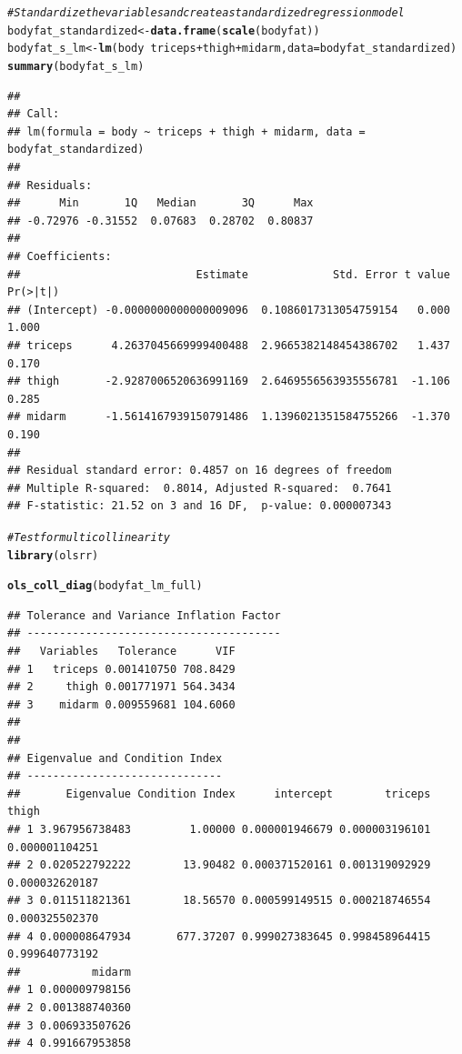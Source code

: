 \documentclass{article}\usepackage[]{graphicx}\usepackage[]{color}
\makeatletter
\newcommand{\hlcom}[1]{\textcolor[rgb]{0.678,0.584,0.686}{\textit{#1}}}%
\newcommand{\hlopt}[1]{\textcolor[rgb]{0,0,0}{#1}}%
\newcommand{\hlstd}[1]{\textcolor[rgb]{0.345,0.345,0.345}{#1}}%
\newcommand{\hlkwb}[1]{\textcolor[rgb]{0.69,0.353,0.396}{#1}}%
\newcommand{\hlkwc}[1]{\textcolor[rgb]{0.333,0.667,0.333}{#1}}%
\newcommand{\hlkwd}[1]{\textcolor[rgb]{0.737,0.353,0.396}{\textbf{#1}}}%
\newenvironment{kframe}{%
 \def\at@end@of@kframe{}%
 \ifinner\ifhmode%
  \def\at@end@of@kframe{\end{minipage}}%
  \begin{minipage}{\columnwidth}%
 \fi\fi%
 \def\FrameCommand##1{\hskip\@totalleftmargin \hskip-\fboxsep
 \colorbox{shadecolor}{##1}\hskip-\fboxsep
     \hskip-\linewidth \hskip-\@totalleftmargin \hskip\columnwidth}%
 \MakeFramed {\advance\hsize-\width
   \@totalleftmargin\z@ \linewidth\hsize
   \@setminipage}}%
 {\par\unskip\endMakeFramed%
 \at@end@of@kframe}
\newenvironment{knitrout}{}{} %
\makeatother
\begin{document}
\begin{knitrout}
\color{fgcolor}\begin{kframe}
\begin{alltt}
\hlcom{# Standardize the variables and create a standardized regression model}
\hlstd{bodyfat_standardized} \hlkwb{<-} \hlkwd{data.frame}\hlstd{(}\hlkwd{scale}\hlstd{(bodyfat))}
\hlstd{bodyfat_s_lm}\hlkwb{<-} \hlkwd{lm}\hlstd{(body} \hlopt{~} \hlstd{triceps} \hlopt{+} \hlstd{thigh} \hlopt{+} \hlstd{midarm,} \hlkwc{data} \hlstd{= bodyfat_standardized)}
\hlkwd{summary}\hlstd{(bodyfat_s_lm)}
\end{alltt}
\begin{verbatim}
## 
## Call:
## lm(formula = body ~ triceps + thigh + midarm, data = bodyfat_standardized)
## 
## Residuals:
##      Min       1Q   Median       3Q      Max 
## -0.72976 -0.31552  0.07683  0.28702  0.80837 
## 
## Coefficients:
##                           Estimate             Std. Error t value Pr(>|t|)
## (Intercept) -0.0000000000000009096  0.1086017313054759154   0.000    1.000
## triceps      4.2637045669999400488  2.9665382148454386702   1.437    0.170
## thigh       -2.9287006520636991169  2.6469556563935556781  -1.106    0.285
## midarm      -1.5614167939150791486  1.1396021351584755266  -1.370    0.190
## 
## Residual standard error: 0.4857 on 16 degrees of freedom
## Multiple R-squared:  0.8014,	Adjusted R-squared:  0.7641 
## F-statistic: 21.52 on 3 and 16 DF,  p-value: 0.000007343
\end{verbatim}
\begin{alltt}
\hlcom{# Test for multicollinearity}
\hlkwd{library}\hlstd{(olsrr)}
\end{alltt}


{\ttfamily\noindent\itshape\color{messagecolor}{\#\# \\\#\# Attaching package: 'olsrr'}}

{\ttfamily\noindent\itshape\color{messagecolor}{\#\# The following object is masked from 'package:datasets':\\\#\# \\\#\#\ \ \ \  rivers}}\begin{alltt}
\hlkwd{ols_coll_diag}\hlstd{(bodyfat_lm_full)}
\end{alltt}
\begin{verbatim}
## Tolerance and Variance Inflation Factor
## ---------------------------------------
##   Variables   Tolerance      VIF
## 1   triceps 0.001410750 708.8429
## 2     thigh 0.001771971 564.3434
## 3    midarm 0.009559681 104.6060
## 
## 
## Eigenvalue and Condition Index
## ------------------------------
##       Eigenvalue Condition Index      intercept        triceps          thigh
## 1 3.967956738483         1.00000 0.000001946679 0.000003196101 0.000001104251
## 2 0.020522792222        13.90482 0.000371520161 0.001319092929 0.000032620187
## 3 0.011511821361        18.56570 0.000599149515 0.000218746554 0.000325502370
## 4 0.000008647934       677.37207 0.999027383645 0.998458964415 0.999640773192
##           midarm
## 1 0.000009798156
## 2 0.001388740360
## 3 0.006933507626
## 4 0.991667953858
\end{verbatim}
\end{kframe}
\end{knitrout}
\end{document}

